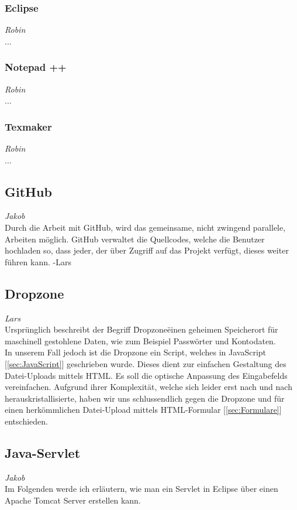 \documentclass[12pt,a4paper,bibliography=totocnumbered,listof=totocnumbered]{scrartcl}
\begin{document}
\subsubsection{Eclipse}
\label{sec:Eclipse}
\emph{Robin}\\
...

\subsubsection{Notepad ++}
\label{sec:Notepad++}
\emph{Robin}\\
...

\subsubsection{Texmaker}
\label{sec:Texmaker}
\emph{Robin}\\
...

\subsection{GitHub}
\emph{Jakob}\\
Durch die Arbeit mit GitHub, wird das gemeinsame, nicht zwingend parallele, Arbeiten möglich. GitHub verwaltet die Quellcodes, welche die Benutzer hochladen so, dass jeder, der über Zugriff auf das Projekt verfügt, dieses weiter führen kann. -Lars

\subsection{Dropzone}
\emph{Lars}\\
Ursprünglich beschreibt der Begriff \"Dropzone\" einen geheimen Speicherort für maschinell gestohlene Daten, wie zum Beispiel Passwörter und Kontodaten.\cite{wiki/Dropzone} \\
In unserem Fall jedoch ist die Dropzone ein Script, welches in JavaScript [\ref{sec:JavaScript}] geschrieben wurde. Dieses dient zur einfachen Gestaltung des Datei-Uploads mittels HTML. Es soll die optische Anpassung des Eingabefelds vereinfachen. 
Aufgrund ihrer Komplexität, welche sich leider erst nach und nach herauskristallisierte, haben wir uns schlussendlich gegen die Dropzone und für einen herkömmlichen Datei-Upload mittels HTML-Formular [\ref{sec:Formulare}] entschieden.

\subsection{Java-Servlet}
\emph{Jakob}\\
Im Folgenden werde ich erläutern, wie man ein Servlet in Eclipse über einen Apache Tomcat Server erstellen kann.
\end{document}
